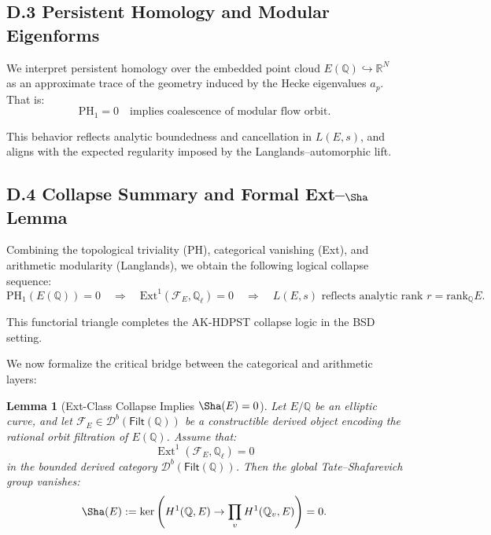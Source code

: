 \documentclass[11pt]{article}
\newtheorem{lemma}[theorem]{Lemma}
\theoremstyle{definition}
\begin{document}
\subsection*{D.3 Persistent Homology and Modular Eigenforms}

We interpret persistent homology over the embedded point cloud \( E(\mathbb{Q}) \hookrightarrow \mathbb{R}^N \) as an approximate trace of the geometry induced by the Hecke eigenvalues \( a_p \).  
That is:
\[
\mathrm{PH}_1 = 0 \quad \text{implies coalescence of modular flow orbit}.
\]

This behavior reflects analytic boundedness and cancellation in \( L(E, s) \), and aligns with the expected regularity imposed by the Langlands–automorphic lift.


\subsection*{D.4 Collapse Summary and Formal Ext--\texorpdfstring{$\Sha$}{Sha} Lemma}

Combining the topological triviality (PH), categorical vanishing (Ext), and arithmetic modularity (Langlands), we obtain the following logical collapse sequence:
\[
\mathrm{PH}_1(E(\mathbb{Q})) = 0
\quad \Rightarrow \quad
\mathrm{Ext}^1(\mathcal{F}_E, \mathbb{Q}_\ell) = 0
\quad \Rightarrow \quad
L(E,s) \text{ reflects analytic rank } r = \mathrm{rank}_\mathbb{Q}E.
\]

This functorial triangle completes the AK-HDPST collapse logic in the BSD setting.

We now formalize the critical bridge between the categorical and arithmetic layers:

\begin{lemma}[Ext-Class Collapse Implies \texorpdfstring{$\Sha(E) = 0$}{Sha=0}]
\label{lem:ext-sha}
Let \( E/\mathbb{Q} \) be an elliptic curve, and let \( \mathcal{F}_E \in \mathcal{D}^b(\mathsf{Filt}(\mathbb{Q})) \) be a constructible derived object encoding the rational orbit filtration of \( E(\mathbb{Q}) \).  
Assume that:
\[
\operatorname{Ext}^1(\mathcal{F}_E, \mathbb{Q}_\ell) = 0
\]
in the bounded derived category \( \mathcal{D}^b(\mathsf{Filt}(\mathbb{Q})) \).  
Then the global Tate–Shafarevich group vanishes:
\[
\Sha(E) := \ker\left( H^1(\mathbb{Q}, E) \rightarrow \prod_v H^1(\mathbb{Q}_v, E) \right) = 0.
\]
\end{lemma}
\end{document}
